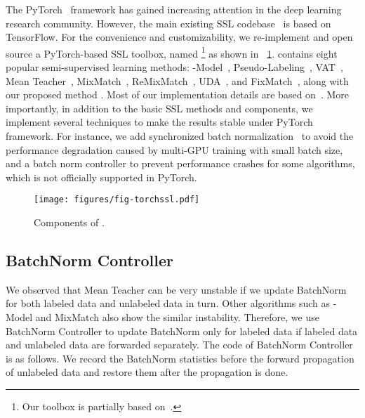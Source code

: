 The PyTorch~\citep{paszke2019pytorch} framework has gained increasing attention in the deep learning research community.
However, the main existing SSL codebase~\citep{Sohn2020fixgit} is based on TensorFlow.
For the convenience and customizability, we re-implement and open source a PyTorch-based SSL toolbox, named \emph{\codebase} \footnote{Our toolbox is partially based on~\cite{Doyup2020git}.} as shown in \figurename~\ref{fig-torchssl}.
\codebase contains eight popular semi-supervised learning methods: -Model~\citep{rasmus2015semi}, Pseudo-Labeling~\citep{lee2013pseudo}, VAT~\citep{miyato2018virtual}, Mean Teacher~\citep{tarvainen2017mean},  MixMatch~\citep{berthelot2019mixmatch}, ReMixMatch~\citep{berthelot2019remixmatch}, UDA~\citep{xie2020unsupervised}, and FixMatch~\citep{sohn2020fixmatch}, along with our proposed method \method. Most of our implementation details are based on~\citep{Sohn2020fixgit}.
More importantly, in addition to the basic SSL methods and components, we implement several techniques to make the results stable under PyTorch framework. For instance, we add synchronized batch normalization~\cite{zhang2018context} to avoid the performance degradation caused by multi-GPU training with small batch size, and a batch norm controller to prevent performance crashes for some algorithms, which is not officially supported in PyTorch. 
\begin{figure}[h!]
    \centering
    \texttt{[image: figures/fig-torchssl.pdf]}
\caption{Components of \codebase.}
    \label{fig-torchssl}
\end{figure}








\subsection{BatchNorm Controller} 
We observed that Mean Teacher can be very unstable if we update BatchNorm for both labeled data and unlabeled data in turn. Other algorithms such as -Model and MixMatch also show the similar instability. Therefore, we use BatchNorm Controller to update BatchNorm only for labeled data if labeled data and unlabeled data are forwarded separately. The code of BatchNorm Controller is as follows. We record the BatchNorm statistics before the forward propagation of unlabeled data and restore them after the propagation is done.  









